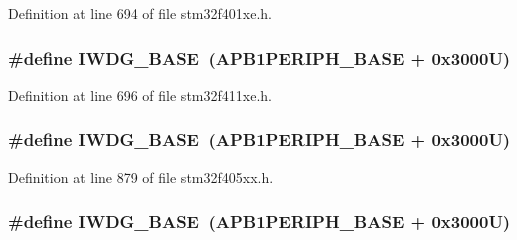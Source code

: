 Definition at line 694 of file stm32f401xe.\+h.

\subsubsection[{\texorpdfstring{I\+W\+D\+G\+\_\+\+B\+A\+SE}{IWDG_BASE}}]{\setlength{\rightskip}{0pt plus 5cm}\#define I\+W\+D\+G\+\_\+\+B\+A\+SE~({\bf A\+P\+B1\+P\+E\+R\+I\+P\+H\+\_\+\+B\+A\+SE} + 0x3000\+U)}\hypertarget{group___peripheral__registers__structures_ga8543ee4997296af5536b007cd4748f55}{}\label{group___peripheral__registers__structures_ga8543ee4997296af5536b007cd4748f55}


Definition at line 696 of file stm32f411xe.\+h.

\subsubsection[{\texorpdfstring{I\+W\+D\+G\+\_\+\+B\+A\+SE}{IWDG_BASE}}]{\setlength{\rightskip}{0pt plus 5cm}\#define I\+W\+D\+G\+\_\+\+B\+A\+SE~({\bf A\+P\+B1\+P\+E\+R\+I\+P\+H\+\_\+\+B\+A\+SE} + 0x3000\+U)}\hypertarget{group___peripheral__registers__structures_ga8543ee4997296af5536b007cd4748f55}{}\label{group___peripheral__registers__structures_ga8543ee4997296af5536b007cd4748f55}


Definition at line 879 of file stm32f405xx.\+h.

\subsubsection[{\texorpdfstring{I\+W\+D\+G\+\_\+\+B\+A\+SE}{IWDG_BASE}}]{\setlength{\rightskip}{0pt plus 5cm}\#define I\+W\+D\+G\+\_\+\+B\+A\+SE~({\bf A\+P\+B1\+P\+E\+R\+I\+P\+H\+\_\+\+B\+A\+SE} + 0x3000\+U)}\hypertarget{group___peripheral__registers__structures_ga8543ee4997296af5536b007cd4748f55}{}\label{group___peripheral__registers__structures_ga8543ee4997296af5536b007cd4748f55}


